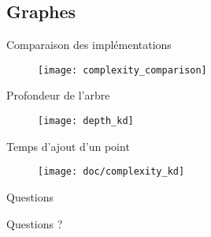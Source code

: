 \documentclass{beamer}
\begin{document}
\subsection{Graphes}
\begin{frame}{Comparaison des implémentations}
    \begin{figure}
        \texttt{[image: complexity\_comparison]}
    \end{figure}
\end{frame}

\begin{frame}{Profondeur de l'arbre}
    \begin{figure}
        \texttt{[image: depth\_kd]}
    \end{figure}
\end{frame}

\begin{frame}{Temps d'ajout d'un point}
    \begin{figure}
        \texttt{[image: doc/complexity\_kd]}
    \end{figure}
\end{frame}


\begin{frame}{Questions}
\begin{center}Questions ?\end{center}
\end{frame}
\end{document}
